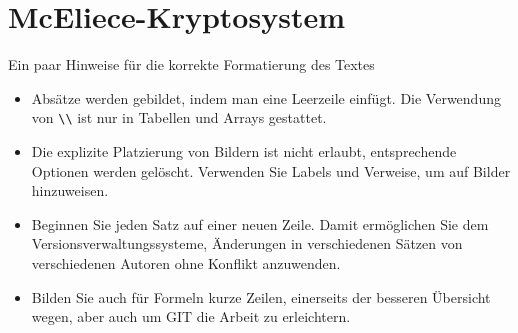 %
%
%
\chapter{McEliece-Kryptosystem\label{chapter:mceliece}}
\begin{refsection}

Ein paar Hinweise für die korrekte Formatierung des Textes
\begin{itemize}
\item
Absätze werden gebildet, indem man eine Leerzeile einfügt.
Die Verwendung von \verb+\\+ ist nur in Tabellen und Arrays gestattet.
\item
Die explizite Platzierung von Bildern ist nicht erlaubt, entsprechende
Optionen werden gelöscht. 
Verwenden Sie Labels und Verweise, um auf Bilder hinzuweisen.
\item
Beginnen Sie jeden Satz auf einer neuen Zeile. 
Damit ermöglichen Sie dem Versionsverwaltungssysteme, Änderungen
in verschiedenen Sätzen von verschiedenen Autoren ohne Konflikt 
anzuwenden.
\item 
Bilden Sie auch für Formeln kurze Zeilen, einerseits der besseren
Übersicht wegen, aber auch um GIT die Arbeit zu erleichtern.
\end{itemize}






\printbibliography[heading=subbibliography]
\end{refsection}
